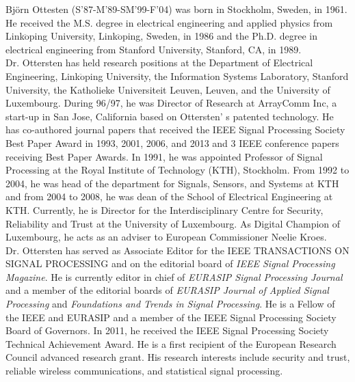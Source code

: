 \documentclass[journal, twocolumn]{IEEEtran}
\begin{document}
\begin{IEEEbiography}
{Bj\"{o}rn Ottesten (S'87-M'89-SM'99-F'04)} was born in Stockholm, Sweden, in 1961. He received
the M.S. degree in electrical engineering and applied
physics from Link$\ddot{\mathrm{o}}$ping University, Link$\ddot{\mathrm{o}}$ping,
Sweden, in 1986 and the Ph.D. degree in electrical
engineering from Stanford University, Stanford, CA,
in 1989. \\
Dr. Ottersten has held
research positions at the Department of Electrical
Engineering, Link$\ddot{\mathrm{o}}$ping University, the Information
Systems Laboratory, Stanford University, the
Katholieke Universiteit Leuven, Leuven, and the
University of Luxembourg. During 96/97, he was Director of Research
at ArrayComm Inc, a start-up in San Jose, California based on Ottersten'
s patented technology. He has co-authored journal papers that received the
IEEE Signal Processing Society Best Paper Award in 1993, 2001, 2006, and
2013 and 3 IEEE conference papers receiving Best Paper Awards. In 1991, he
was appointed Professor of Signal Processing at the Royal Institute of Technology
(KTH), Stockholm. From 1992 to 2004, he was head of the department
for Signals, Sensors, and Systems at KTH and from 2004 to 2008, he was dean
of the School of Electrical Engineering at KTH. Currently, he is
Director for the Interdisciplinary Centre for Security, Reliability and Trust at
the University of Luxembourg. As Digital Champion of Luxembourg, he acts
as an adviser to European Commissioner Neelie Kroes. \\
Dr. Ottersten has served
as Associate Editor for the IEEE TRANSACTIONS ON SIGNAL PROCESSING and
on the editorial board of \textit{IEEE Signal Processing Magazine}. He is currently
editor in chief of \textit{EURASIP Signal Processing Journal} and a member of
the editorial boards of \textit{EURASIP Journal of Applied Signal Processing} and
\textit{Foundations and Trends in Signal Processing}. He is a Fellow of the
IEEE and EURASIP and a member of the IEEE Signal Processing Society
Board of Governors. In 2011, he received the IEEE Signal Processing Society
Technical Achievement Award. He is a first recipient of the European Research
Council advanced research grant. His research interests include security and
trust, reliable wireless communications, and statistical signal processing.
\end{IEEEbiography}
\end{document}
